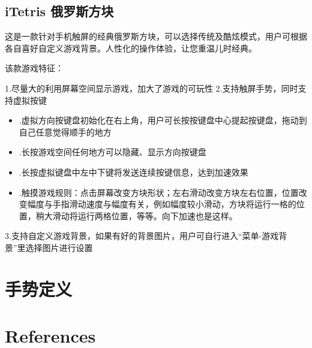 \documentclass[9pt,b5paper]{article}
\begin{document}
\subsection{iTetris 俄罗斯方块}
\label{sec-2-1}

这是一款针对手机触屏的经典俄罗斯方块，可以选择传统及酷炫模式，用户可根据各自喜好自定义游戏背景。人性化的操作体验，让您重温儿时经典。

该款游戏特征：

1.尽量大的利用屏幕空间显示游戏，加大了游戏的可玩性
2.支持触屏手势，同时支持虚拟按键
\begin{itemize}
\item .虚拟方向按键盘初始化在右上角，用户可长按按键盘中心提起按键盘，拖动到自己任意觉得顺手的地方
\item .长按游戏空间任何地方可以隐藏、显示方向按键盘
\item .长按虚拟键盘中左中下键将发送连续按键信息，达到加速效果
\item .触摸游戏规则：点击屏幕改变方块形状；左右滑动改变方块左右位置，位置改变幅度与手指滑动速度与幅度有关，例如幅度较小滑动，方块将运行一格的位置，稍大滑动将运行两格位置，等等。向下加速也是这样。
\end{itemize}
3.支持自定义游戏背景，如果有好的背景图片，用户可自行进入“菜单-游戏背景”里选择图片进行设置

\section{手势定义}
\label{sec-3}

\section{References}
\label{sec-4}
\end{document}
